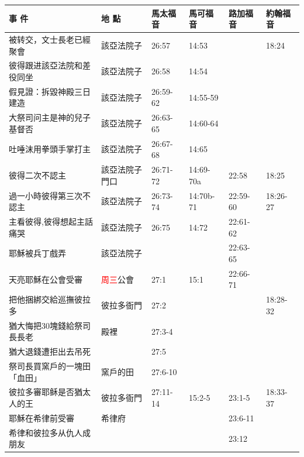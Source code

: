 \begin{table}[H]
  \centering
    \begin{tabular}{p{14em}|p{7.93em}|l|l|l|p{4.855em}}
    \toprule
    \textbf{事 件} & \textbf{地 點} & \multicolumn{1}{p{5.285em}|}{\textbf{馬太福音}} & \multicolumn{1}{p{5.57em}|}{\textbf{馬可福音}} & \multicolumn{1}{p{5.285em}|}{\textbf{路加福音}} & \textbf{約翰福音} \\  \midrule


被转交，文士長老已經聚會&該亞法院子&26:57&14:53&&18:24\\\midrule
彼得跟进該亞法院和差役同坐&該亞法院子&26:58&14:54   &&  \\\midrule
假見證：拆毀神殿三日建造&該亞法院子&26:59-62&14:55-59 &&  \\\midrule
大祭司问主是神的兒子基督否&該亞法院子&26:63-65&14:60-64&&  \\\midrule
吐唾沫用拳頭手掌打主&該亞法院子&26:67-68&14:65&&  \\\midrule


彼得二次不認主&該亞法院子門口&26:71-72& 14:69-70a &22:58&18:25\\\midrule

過一小時彼得第三次不認主&該亞法院子 &26:73-74&14:70b-71&22:59-60&18:26-27\\\midrule

主看彼得,彼得想起主話痛哭&該亞法院子 &26:75&14:72&22:61-62&\\\midrule
耶穌被兵丁戲弄&該亞法院子&       &       &22:63-65&  \\\midrule
天亮耶穌在公會受審& \textcolor{red}{周三}公會   &27:1&15:1&22:66-71&  \\\midrule

把他捆綁交給巡撫彼拉多&彼拉多衙門& 27:2&       &&18:28-32\\\midrule

猶大悔把30塊錢給祭司長長老&殿裡&27:3-4&       &&  \\\midrule
猶大退錢遭拒出去吊死&       &27:5&       &&  \\\midrule
祭司長買窯戶的一塊田「血田」& 窯戶的田 &27:6-10&       &&  \\\midrule


彼拉多審耶稣是否猶太人的王&彼拉多衙門& 27:11-14&15:2-5&23:1-5&18:33-37\\\midrule
耶穌在希律前受審&希律府&       &       &23:6-11&  \\\midrule
希律和彼拉多从仇人成朋友&&       &       &23:12&  \\\midrule


\end{tabular}
\end{table}
